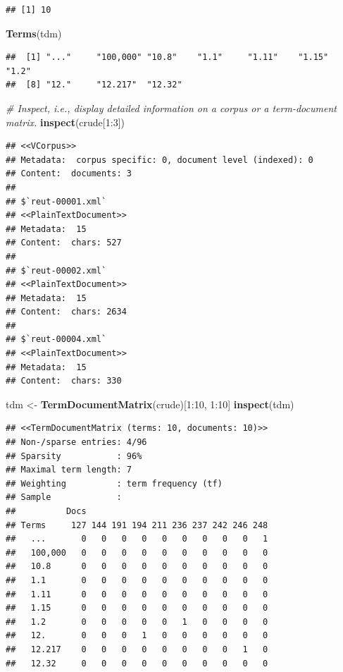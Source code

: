\documentclass[]{book}
\newenvironment{Shaded}{\begin{snugshade}}{\end{snugshade}}
\newcommand{\KeywordTok}[1]{\textcolor[rgb]{0.13,0.29,0.53}{\textbf{{#1}}}}
\newcommand{\DecValTok}[1]{\textcolor[rgb]{0.00,0.00,0.81}{{#1}}}
\newcommand{\StringTok}[1]{\textcolor[rgb]{0.31,0.60,0.02}{{#1}}}
\newcommand{\CommentTok}[1]{\textcolor[rgb]{0.56,0.35,0.01}{\textit{{#1}}}}
\newcommand{\NormalTok}[1]{{#1}}
\begin{document}
\begin{verbatim}
## [1] 10
\end{verbatim}

\begin{Shaded}
\begin{Highlighting}[]
\KeywordTok{Terms}\NormalTok{(tdm)}
\end{Highlighting}
\end{Shaded}

\begin{verbatim}
##  [1] "..."     "100,000" "10.8"    "1.1"     "1.11"    "1.15"    "1.2"    
##  [8] "12."     "12.217"  "12.32"
\end{verbatim}

\begin{Shaded}
\begin{Highlighting}[]
\CommentTok{# Inspect, i.e., display detailed information on a corpus or a term-document matrix.}
\KeywordTok{inspect}\NormalTok{(crude[}\DecValTok{1}\NormalTok{:}\DecValTok{3}\NormalTok{])}
\end{Highlighting}
\end{Shaded}

\begin{verbatim}
## <<VCorpus>>
## Metadata:  corpus specific: 0, document level (indexed): 0
## Content:  documents: 3
## 
## $`reut-00001.xml`
## <<PlainTextDocument>>
## Metadata:  15
## Content:  chars: 527
## 
## $`reut-00002.xml`
## <<PlainTextDocument>>
## Metadata:  15
## Content:  chars: 2634
## 
## $`reut-00004.xml`
## <<PlainTextDocument>>
## Metadata:  15
## Content:  chars: 330
\end{verbatim}

\begin{Shaded}
\begin{Highlighting}[]
\NormalTok{tdm <-}\StringTok{ }\KeywordTok{TermDocumentMatrix}\NormalTok{(crude)[}\DecValTok{1}\NormalTok{:}\DecValTok{10}\NormalTok{, }\DecValTok{1}\NormalTok{:}\DecValTok{10}\NormalTok{]}
\KeywordTok{inspect}\NormalTok{(tdm)}
\end{Highlighting}
\end{Shaded}

\begin{verbatim}
## <<TermDocumentMatrix (terms: 10, documents: 10)>>
## Non-/sparse entries: 4/96
## Sparsity           : 96%
## Maximal term length: 7
## Weighting          : term frequency (tf)
## Sample             :
##          Docs
## Terms     127 144 191 194 211 236 237 242 246 248
##   ...       0   0   0   0   0   0   0   0   0   1
##   100,000   0   0   0   0   0   0   0   0   0   0
##   10.8      0   0   0   0   0   0   0   0   0   0
##   1.1       0   0   0   0   0   0   0   0   0   0
##   1.11      0   0   0   0   0   0   0   0   0   0
##   1.15      0   0   0   0   0   0   0   0   0   0
##   1.2       0   0   0   0   0   1   0   0   0   0
##   12.       0   0   0   1   0   0   0   0   0   0
##   12.217    0   0   0   0   0   0   0   0   1   0
##   12.32     0   0   0   0   0   0   0   0   0   0
\end{verbatim}
\end{document}

